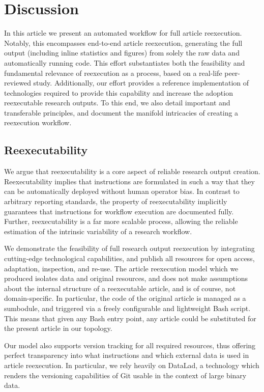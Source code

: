 \section{Discussion}

In this article we present an automated workflow for full article reexecution.
Notably, this encompasses end-to-end article reexecution, generating the full output (including inline statistics and figures) from solely the raw data and automatically running code.
This effort substantiates both the feasibility and fundamental relevance of reexecution as a process, based on a real-life peer-reviewed study.
Additionally, our effort provides a reference implementation of technologies required to provide this capability and increase the adoption reexecutable research outputs.
To this end, we also detail important and transferable principles, and document the manifold intricacies of creating a reexecution workflow.

\subsection{Reexecutability}
We argue that reexecutability is a core aspect of reliable research output creation.
Reexecutability implies that instructions are formulated in such a way that they can be automatically deployed without human operator bias.
In contrast to arbitrary reporting standards, the property of reexecutability implicitly guarantees that instructions for workflow execution are documented fully.
Further, reexecutability is a far more scalable process, allowing the reliable estimation of the intrinsic variability of a research workflow.

We demonstrate the feasibility of full research output reexecution by integrating cutting-edge technological capabilities, and publish all resources for open access, adaptation, inspection, and re-use.
The article reexecution model which we produced isolates data and original resources, and does not make assumptions about the internal structure of a reexecutable article, and is of course, not domain-specific.
In particular, the code of the original article is managed as a sumbodule, and triggered via a freely configurable and lightweight Bash script.
This means that given any Bash entry point, any article could be substituted for the present article in our topology.

Our model also supports version tracking for all required resources, thus offering perfect transparency into what instructions and which external data is used in article reexecution.
In particular, we rely heavily on DataLad, a technology which renders the versioning capabilities of Git usable in the context of large binary data.

